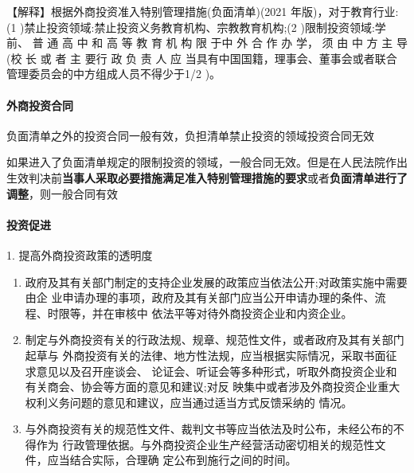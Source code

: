 \documentclass[UTF8,12pt]{ctexart}
\numberwithin{equation}{section} %
\numberwithin{figure}{section}
\numberwithin{table}{section}
\begin{document}
	【解释】根据外商投资准入特别管理措施(负面清单)(2021 年版)，对于教育行业: (1 )禁止投资领域:禁止投资义务教育机构、宗教教育机构;(2 )限制投资领域:学前、 普 通 高 中 和 高 等 教 育 机 构 限 于中 外 合 作 办 学， 须 由 中 方 主 导 (校 长 或 者 主 要行 政 负 责 人 应 当具有中国国籍，理事会、董事会或者联合管理委员会的中方组成人员不得少于1/2 )。
	
	\paragraph{外商投资合同}
	负面清单之外的投资合同一般有效，负担清单禁止投资的领域投资合同无效
	
	如果进入了负面清单规定的限制投资的领域，一般合同无效。但是在人民法院作出生效判决前\textbf{当事人采取必要措施满足准入特别管理措施的要求}或者\textbf{负面清单进行了调整}，则一般合同有效
	
	
	
	\paragraph{投资促进}
	1. 提高外商投资政策的透明度
	\begin{enumerate}
		\item 政府及其有关部门制定的支持企业发展的政策应当依法公开;对政策实施中需要由企 业申请办理的事项，政府及其有关部门应当公开申请办理的条件、流程、时限等，并在审核中 依法平等对待外商投资企业和内资企业。
		
		\item 制定与外商投资有关的行政法规、规章、规范性文件，或者政府及其有关部门起草与 外商投资有关的法律、地方性法规，应当根据实际情况，采取书面征求意见以及召开座谈会、 论证会、听证会等多种形式，听取外商投资企业和有关商会、协会等方面的意见和建议;对反 映集中或者涉及外商投资企业重大权利义务问题的意见和建议，应当通过适当方式反馈采纳的 情况。
		
		\item 与外商投资有关的规范性文件、裁判文书等应当依法及时公布，未经公布的不得作为 行政管理依据。与外商投资企业生产经营活动密切相关的规范性文件，应当结合实际，合理确 定公布到施行之间的时间。
	\end{enumerate}
	
\end{document}
